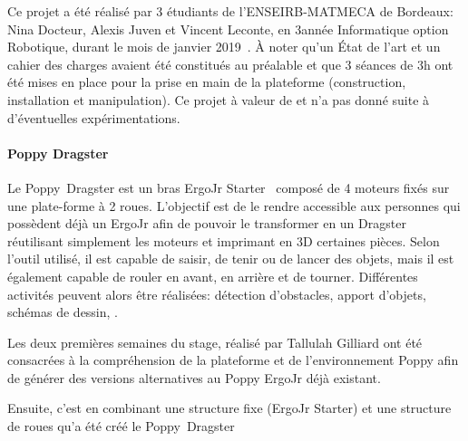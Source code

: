             Ce projet a été réalisé par 3 étudiants de l'ENSEIRB-MATMECA de Bordeaux: Nina Docteur, Alexis Juven et Vincent Leconte, en 3\ieme année Informatique option Robotique, durant le mois de janvier 2019~. À noter qu'un État de l'art et un cahier des charges avaient été constitués au préalable et que 3 séances de 3h ont été mises en place pour la prise en main de la plateforme (construction,  installation  et  manipulation).
            Ce projet à valeur de  et n'a pas donné suite à d'éventuelles expérimentations.
        \paragraph{Poppy Dragster}\label{sec:dragster}
            Le Poppy~Dragster est un bras ErgoJr Starter~ composé de 4 moteurs fixés sur une plate-forme à 2 roues. L'objectif est de le rendre accessible aux personnes qui possèdent déjà un ErgoJr afin de pouvoir le transformer en un Dragster réutilisant simplement les moteurs et imprimant en 3D certaines pièces. Selon l’outil utilisé, il est capable de saisir, de tenir ou de lancer des objets, mais il est également capable de rouler en avant, en arrière et de tourner. Différentes activités peuvent alors être réalisées: détection d'obstacles, apport d'objets, schémas de dessin, \etc.\par%
            Les deux premières semaines du stage, réalisé par Tallulah Gilliard ont été consacrées à la compréhension de la plateforme et de l'environnement Poppy afin de générer des versions alternatives au Poppy ErgoJr déjà existant.\par%
            Ensuite, c'est en combinant une structure fixe (ErgoJr Starter) et une structure de roues qu'a été créé le Poppy~Dragster

